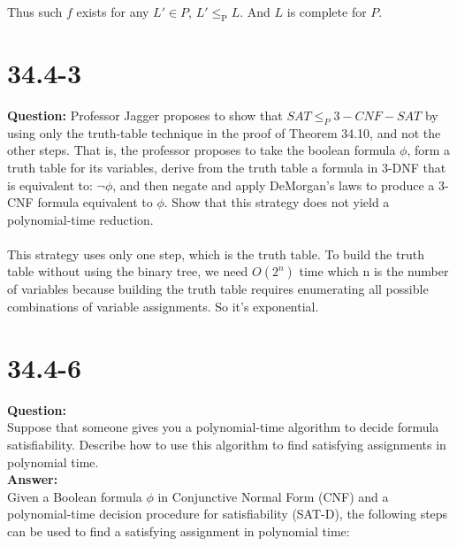 \documentclass[12pt]{article}
\begin{document}
Thus such $f$ exists for any $L' \in P$, $L' \le_\text{P} L$. And $L$ is complete for $P$.

\section{34.4-3}
\textbf{Question: }Professor Jagger proposes to show that \(SAT \leq_P 3-CNF-SAT \) by using only the truth-table technique in the proof of Theorem 34.10, and not the other steps. That is, the professor proposes to take the boolean formula \(\phi\), form a truth table for its variables, derive from the truth table a formula in 3-DNF that is equivalent
to: \(\lnot\phi\), and then negate and apply DeMorgan’s laws to produce a 3-CNF formula
equivalent to \(\phi\). Show that this strategy does not yield a polynomial-time reduction.
\\
\\
This strategy uses only one step, which is the truth table. To build the truth table without using the binary tree, we need \(O(2^n)\) time which n is the number of variables because building the truth table requires enumerating all possible combinations of variable assignments. So it's exponential.

\section{34.4-6}
\textbf{Question:}\\
Suppose that someone gives you a polynomial-time algorithm to decide formula
satisfiability. Describe how to use this algorithm to find satisfying assignments in
polynomial time.\\
\textbf{Answer:}\\
Given a Boolean formula \( \phi \) in Conjunctive Normal Form (CNF) and a polynomial-time decision procedure for satisfiability (SAT-D), the following steps can be used to find a satisfying assignment in polynomial time:
\end{document}
